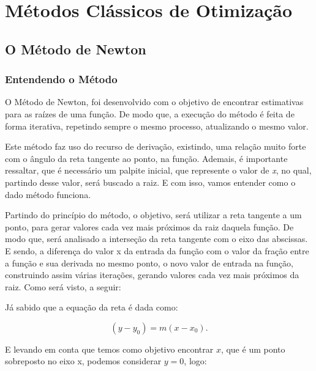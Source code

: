 

\chapter{\Large{Métodos Clássicos de Otimização}}\label{chp:2}


\section{{O Método de Newton}}


\subsection{Entendendo o Método}


\hspace{0.8cm}
O Método de Newton, foi desenvolvido com o objetivo de encontrar estimativas
para as raízes de uma função. De modo que, a execução do método é feita de
forma iterativa, repetindo sempre o mesmo processo, atualizando o mesmo valor.

Este método faz uso do recurso de derivação, existindo, uma relação muito
forte com o ângulo da reta tangente ao ponto, na função. Ademais, é
importante ressaltar, que é necessário um palpite inicial, que represente
o valor de \textit{x}, no qual, partindo desse valor, será buscado a raiz.
E com isso, vamos entender como o dado método funciona.

Partindo do princípio do método, o objetivo, será utilizar a reta tangente a um
ponto, para gerar valores cada vez mais próximos da raiz daquela função. De
modo que, será analisado a interseção da reta tangente com o eixo das
abscissas. E sendo, a diferença do valor x da entrada da função com o valor da
fração entre a função e sua derivada no mesmo ponto, o novo valor de entrada na
função, construindo assim várias iterações, gerando valores cada vez mais
próximos da raiz. Como será visto, a seguir:

Já sabido que a equação da reta é dada como:

\begin{equation}
    (y - y_0) = m(x - x_0).
\end{equation}

E levando em conta que temos como objetivo encontrar $x$, que é um ponto
sobreposto no eixo x, podemos considerar $y=0$, logo:

